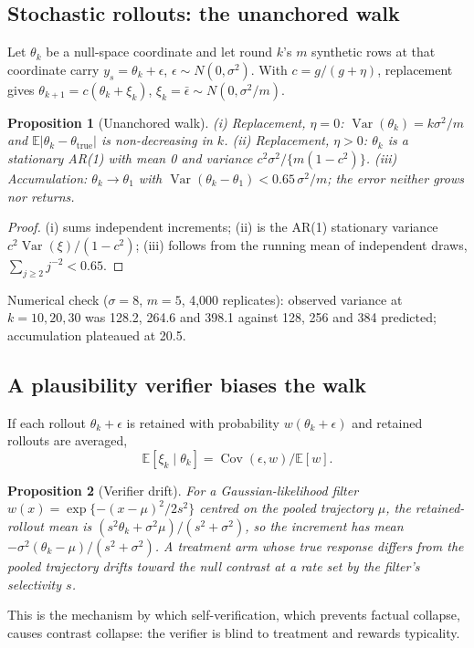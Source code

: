 \documentclass[11pt,a4paper]{article}
\newcommand{\Ex}{\mathbb E}
\newcommand{\Var}{\operatorname{Var}}
\newcommand{\Cov}{\operatorname{Cov}}
\newtheorem{proposition}{Proposition}[section]
\begin{document}
\subsection{Stochastic rollouts: the unanchored walk}
Let $\theta_k$ be a null-space coordinate and let round $k$'s $m$ synthetic rows at that coordinate carry $y_s=\theta_k+\epsilon$, $\epsilon\sim N(0,\sigma^2)$. With $c=g/(g+\eta)$, replacement gives $\theta_{k+1}=c(\theta_k+\xi_k)$, $\xi_k=\bar\epsilon\sim N(0,\sigma^2/m)$.
\begin{proposition}[Unanchored walk]
(i) Replacement, $\eta=0$: $\Var(\theta_k)=k\sigma^2/m$ and $\Ex|\theta_k-\theta_{\mathrm{true}}|$ is non-decreasing in $k$. (ii) Replacement, $\eta>0$: $\theta_k$ is a stationary AR(1) with mean 0 and variance $c^2\sigma^2/\{m(1-c^2)\}$. (iii) Accumulation: $\theta_k\to\theta_1$ with $\Var(\theta_k-\theta_1)<0.65\,\sigma^2/m$; the error neither grows nor returns.
\end{proposition}
\begin{proof}
(i) sums independent increments; (ii) is the AR(1) stationary variance $c^2\Var(\xi)/(1-c^2)$; (iii) follows from the running mean of independent draws, $\sum_{j\ge2}j^{-2}<0.65$.
\end{proof}
Numerical check ($\sigma=8$, $m=5$, 4,000 replicates): observed variance at $k=10,20,30$ was 128.2, 264.6 and 398.1 against 128, 256 and 384 predicted; accumulation plateaued at 20.5.

\subsection{A plausibility verifier biases the walk}
If each rollout $\theta_k+\epsilon$ is retained with probability $w(\theta_k+\epsilon)$ and retained rollouts are averaged,
\begin{equation}
\Ex[\xi_k\mid\theta_k]=\Cov(\epsilon,w)/\Ex[w] .
\end{equation}
\begin{proposition}[Verifier drift]
For a Gaussian-likelihood filter $w(x)=\exp\{-(x-\mu)^2/2s^2\}$ centred on the pooled trajectory $\mu$, the retained-rollout mean is $(s^2\theta_k+\sigma^2\mu)/(s^2+\sigma^2)$, so the increment has mean $-\sigma^2(\theta_k-\mu)/(s^2+\sigma^2)$. A treatment arm whose true response differs from the pooled trajectory drifts toward the null contrast at a rate set by the filter's selectivity $s$.
\end{proposition}
This is the mechanism by which self-verification, which prevents factual collapse\cite{fu2025selfverification}, causes contrast collapse: the verifier is blind to treatment and rewards typicality.
\end{document}
